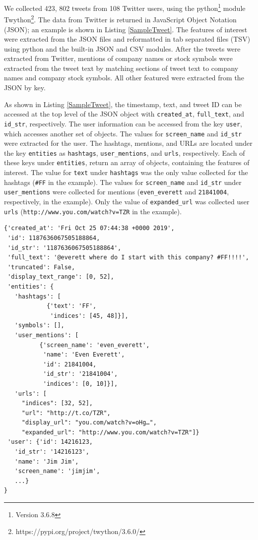 \documentclass[journal]{IEEEtran}
\begin{document}
We collected 423, 802 tweets from 108 Twitter users, using the
 python\footnote{Version 3.6.8}
 module Twython\footnote{https://pypi.org/project/twython/3.6.0/}.
The data from Twitter is returned in JavaScript Object Notation (JSON); 
 an example is shown in Listing \ref{SampleTweet}.
The features of interest were extracted from the JSON files and reformatted in tab
 separated files (TSV) using python and the built-in JSON and CSV modules.
After the tweets were extracted from Twitter,
 mentions of company names or stock symbols were extracted from the tweet text by
 matching sections of tweet text to company names and company stock symbols.
All other featured were extracted from the JSON by key.

As shown in Listing \ref{SampleTweet}, the timestamp, text, and tweet ID
 can be accessed at the top level of the JSON object with \texttt{created\_at},
 \texttt{full\_text}, and \texttt{id\_str}, respectively. 
The user information can be accessed from the key \texttt{user}, 
 which accesses another set of objects. 
The values for \texttt{screen\_name} and \texttt{id\_str} were extracted for the user.
The hashtags, mentions, and URLs are located under the key \texttt{entities} as
 \texttt{hashtags}, \texttt{user\_mentions}, and \texttt{urls}, respectively.
Each of these keys under \texttt{entities}, return an array of objects,
 containing the features of interest. 
The value for \texttt{text} under \texttt{hashtags} was the only value collected
 for the hashtags (\texttt{\#FF} in the example).
The values for \texttt{screen\_name} and \texttt{id\_str} under 
 \texttt{user\_mentions} were collected for mentions (\texttt{even\_everett} and
 \texttt{21841004}, respectively, in the example).
Only the value of \texttt{expanded\_url} was collected user \texttt{urls}
 (\texttt{http://www.you.com/watch?v=TZR} in the example).


\begin{lstlisting}[frame=single,
 caption={Sample Tweet JSON},
 label={SampleTweet}]
{'created_at': 'Fri Oct 25 07:44:38 +0000 2019',
 'id': 1187636067505188864,
 'id_str': '1187636067505188864',
 'full_text': '@everett where do I start with this company? #FF!!!!',
 'truncated': False,
 'display_text_range': [0, 52],
 'entities': {
   'hashtags': [
            {'text': 'FF',
             'indices': [45, 48]}],
   'symbols': [],
   'user_mentions': [
          {'screen_name': 'even_everett',
           'name': 'Even Everett',
           'id': 21841004,
           'id_str': '21841004',
           'indices': [0, 10]}],
   'urls': [
     "indices": [32, 52],
     "url": "http://t.co/TZR",
     "display_url": "you.com/watch?v=oHg…",
     "expanded_url": "http://www.you.com/watch?v=TZR"]}
 'user': {'id': 14216123,
   'id_str': '14216123',
   'name': 'Jim Jim',
   'screen_name': 'jimjim',
   ...}
}
\end{lstlisting}
\end{document}
